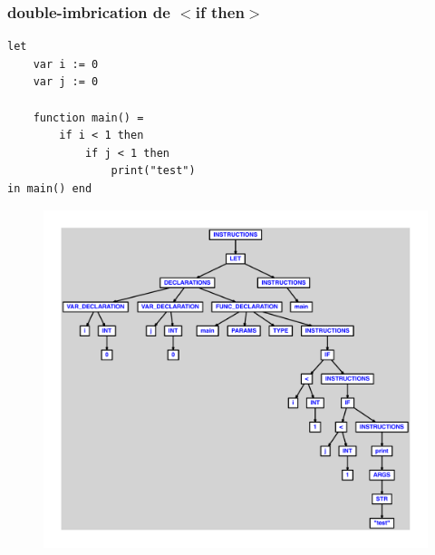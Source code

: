\documentclass{article}
\begin{document}
\subsubsection{double-imbrication de $ < $if then$ > $}
\begin{lstlisting}
let
	var i := 0
	var j := 0

	function main() =
		if i < 1 then
			if j < 1 then
				print("test")
in main() end
\end{lstlisting}
\newpage
\begin{figure}[H]
\centering
\includegraphics[max width=\textwidth]{ast/ast_263.pdf}
\end{figure}
\newpage
\end{document}
